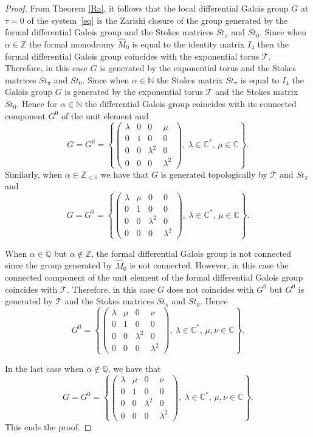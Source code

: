 \documentclass[10pt,a4paper]{article}
\numberwithin{equation}{section}
\begin{document}
 \begin{proof}
 From Theorem \ref{Ra}, it follows that the local differential Galois group $G$ at $\tau=0$ of the system~\eqref{eq}
 is the Zariski closure of the group generated by the formal differential Galois group
 and the Stokes matrices $St_{\pi}$ and $St_0$. Since when $\alpha\in\mathbb{Z}$ the formal monodromy $\hat{M}_0$ is equal
 to the identity matrix $I_4$ then the formal differential Galois group coincides with the exponential torus $\mathcal{T}$.
 Therefore, in this case $G$ is generated by the exponential torus and the
 Stokes matrices $St_{\pi}$ and $St_0$. Since when $\alpha\in\mathbb{N}$ the Stokes matrix $St_{\pi}$ is equal to $I_4$ the
 Galois group $G$ is generated by the exponential torus $\mathcal{T}$ and the Stokes matrix $St_0$. Hence for $\alpha\in\mathbb{N}$
 the differential Galois group coincides with its connected component $G^0$ of the unit element and
 \[
 G=G^0=\left\{\begin{pmatrix}
 \lambda & 0 & 0 & \mu\\
 0 & 1 & 0 & 0\\
 0 & 0 & \lambda^2 & 0\\
 0 & 0 & 0 & \lambda^2
 \end{pmatrix}, \ \lambda\in\mathbb{C}^*,\, \mu\in\mathbb{C}\right\} .
 \]
Similarly, when $\alpha\in\mathbb{Z}_{\leq 0}$ we have that $G$
 is generated topologically by $\mathcal{T}$ and $St_{\pi}$ and
 \[
 G=G^0=\left\{\begin{pmatrix}
 \lambda & \mu & 0 & 0\\
 0 & 1 & 0 & 0\\
 0 & 0 & \lambda^2 & 0\\
 0 & 0 & 0 & \lambda^2
 \end{pmatrix}, \ \lambda\in\mathbb{C}^*,\, \mu\in\mathbb{C}\right\} .
 \]

 When $\alpha\in\mathbb{Q}$ but $\alpha\notin\mathbb{Z}$, the formal differential Galois group is not connected since the group generated
 by $\hat{M}_0$ is not connected. However, in this case the connected component of the unit element of the formal differential
 Galois group coincides with $\mathcal{T}$. Therefore, in this case $G$ does not coincides with $G^0$ but $G^0$ is generated by $\mathcal{T}$ and
 the Stokes matrices $St_{\pi}$ and $St_0$. Hence
 \[
 G^0=\left\{\begin{pmatrix}
 \lambda & \mu & 0 & \nu\\
 0 & 1 & 0 & 0\\
 0 & 0 & \lambda^2 & 0\\
 0 & 0 & 0 & \lambda^2
 \end{pmatrix}, \ \lambda\in\mathbb{C}^*,\, \mu, \nu\in\mathbb{C}\right\} .
 \]

 In the last case when $\alpha\notin\mathbb{Q}$, we have that
 \[
 G=G^0=\left\{\begin{pmatrix}
 \lambda & \mu & 0 & \nu\\
 0 & 1 & 0 & 0\\
 0 & 0 & \lambda^2 & 0\\
 0 & 0 & 0 & \lambda^2
 \end{pmatrix}, \ \lambda\in\mathbb{C}^*,\, \mu, \nu\in\mathbb{C}\right\} .
 \]
 This ends the proof.
 \end{proof}
\end{document}

